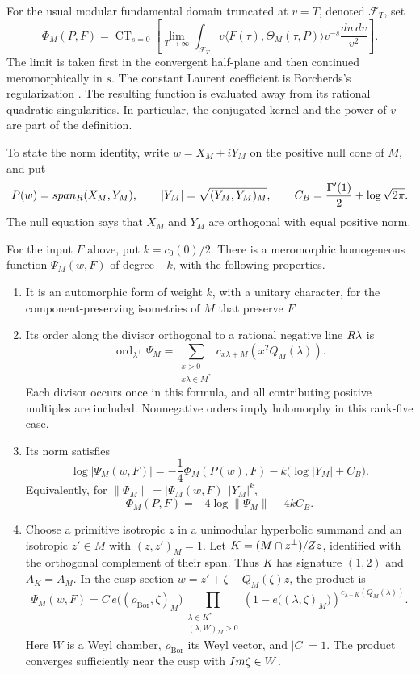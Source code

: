 For the usual modular fundamental domain truncated at \(v=T\),
denoted \(\mathcal F_T\), set
\[
 \Phi_M(P,F)=\operatorname{CT}_{s=0}
 \left[
 \lim_{T\to\infty}
 \int_{\mathcal F_T}
  v\langle F(\tau),\Theta_M(\tau,P)\rangle v^{-s}
  \frac{du\,dv}{v^2}
 \right].
\]
The limit is taken first in the convergent half-plane and then
continued meromorphically in \(s\).
The constant Laurent coefficient is Borcherds's regularization
\cite[\S6]{B}.
The resulting function is evaluated away from its rational quadratic
singularities.  In particular, the conjugated kernel and the power
of \(v\) are part of the definition.

To state the norm identity, write \(w=X_M+iY_M\) on the positive
null cone of \(M\), and put
\[
 P(w)=span_{R}(X_M,Y_M),\qquad
 |Y_M|=\sqrt{(Y_M,Y_M)_M},\qquad
 C_B=\frac{\Gamma'(1)}2+\log\sqrt{2\pi}.
\]
The null equation says that \(X_M\) and \(Y_M\) are orthogonal
with equal positive norm.

\begin{theorem}
\label{thm:singular-theta-lift}
For the input \(F\) above, put \(k=c_0(0)/2\).
There is a meromorphic homogeneous function \(\Psi_M(w,F)\)
of degree \(-k\), with the following properties.
\begin{enumerate}[label=\textup{(\arabic*)}]
\item It is an automorphic form of weight \(k\), with a unitary
character, for the component-preserving isometries of \(M\)
that preserve \(F\).
\item Its order along the divisor orthogonal to a rational
negative line \(R\lambda\) is
\[
 \operatorname{ord}_{\lambda^\perp}\Psi_M
 =\sum_{\substack{x>0\\x\lambda\in M^*}}
 c_{x\lambda+M}\!\left(x^2Q_M(\lambda)\right).
\]
Each divisor occurs once in this formula, and all contributing
positive multiples are included.
Nonnegative orders imply holomorphy in this rank-five case.
\item Its norm satisfies
\[
 \log|\Psi_M(w,F)|
 =-\frac14\Phi_M(P(w),F)
       -k\bigl(\log|Y_M|+C_B\bigr).
\]
Equivalently, for
\(\|\Psi_M\|=|\Psi_M(w,F)|\,|Y_M|^k\),
\[
 \Phi_M(P,F)=-4\log\|\Psi_M\|-4kC_B.
\]
\item Choose a primitive isotropic \(z\) in a unimodular
hyperbolic summand and an isotropic \(z'\in M\) with
\((z,z')_M=1\).  Let
\(K=(M\cap z^\perp)/Z z\), identified with the orthogonal
complement of their span.  Thus \(K\) has signature \((1,2)\)
and \(A_K=A_M\).
In the cusp section \(w=z'+\zeta-Q_M(\zeta)z\), the product is
\[
 \Psi_M(w,F)
 =C\,e\bigl((\rho_{\mathrm{Bor}},\zeta)_M\bigr)
 \prod_{\substack{\lambda\in K^*\\(\lambda,W)_M>0}}
 \left(1-e\bigl((\lambda,\zeta)_M\bigr)\right)^{
                  c_{\lambda+K}(Q_M(\lambda))}.
\]
Here \(W\) is a Weyl chamber, \(\rho_{\mathrm{Bor}}\) its
Weyl vector, and \(|C|=1\).
The product converges sufficiently near the cusp with
\(Im\zeta\in W\).
\end{enumerate}
\end{theorem}

